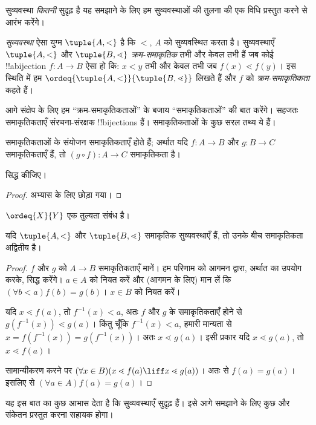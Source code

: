 \documentclass[../../../include/open-logic-section]{subfiles}
\begin{document}

सुव्यवस्था \emph{कितनी} सुदृढ़ है यह समझाने के लिए हम सुव्यवस्थाओं की तुलना
की एक विधि प्रस्तुत करने से आरंभ करेंगे।

\begin{defn}
\emph{सुव्यवस्था} ऐसा युग्म $\tuple{A, <}$ है कि $<$, $A$ को सुव्यवस्थित
करता है। सुव्यवस्थाएँ $\tuple{A, <}$ और $\tuple{B, \lessdot}$
\emph{क्रम-समाकृतिक} तभी और केवल तभी हैं जब कोई !!a{bijection}
$f \colon A \to B$ ऐसा हो कि: $x < y$ तभी और केवल तभी जब
$f(x) \lessdot f(y)$। इस स्थिति में हम
$\ordeq{\tuple{A, <}}{\tuple{B, \lessdot}}$ लिखते हैं और $f$ को
\emph{क्रम-समाकृतिकता} कहते हैं।
\end{defn}
\noindent
आगे संक्षेप के लिए हम ``क्रम-समाकृतिकताओं'' के बजाय ``समाकृतिकताओं'' की बात
करेंगे। सहजतः समाकृतिकताएँ संरचना-संरक्षक !!{bijection}s हैं। समाकृतिकताओं
के कुछ सरल तथ्य ये हैं।

\begin{lem}
समाकृतिकताओं के संयोजन समाकृतिकताएँ होते हैं; अर्थात यदि $f \colon A \to B$
और $g \colon B \to C$ समाकृतिकताएँ हैं, तो
$(g \circ f) \colon A \to C$ समाकृतिकता है।
\end{lem}
\begin{prob}
	 सिद्ध कीजिए।
\end{prob}
\begin{proof}
अभ्यास के लिए छोड़ा गया।
\end{proof}
\begin{cor}
	$\ordeq{X}{Y}$ एक तुल्यता संबंध है।
\end{cor}
\begin{prop}
यदि $\tuple{A, <}$ और $\tuple{B, \lessdot}$ समाकृतिक सुव्यवस्थाएँ हैं, तो
उनके बीच समाकृतिकता अद्वितीय है।
\end{prop}

\begin{proof}
$f$ और $g$ को $A \to B$ समाकृतिकताएँ मानें। हम परिणाम को आगमन द्वारा,
अर्थात  का उपयोग करके, सिद्ध करेंगे। $a\in A$
को नियत करें और (आगमन के लिए) मान लें कि $(\forall b < a)f(b) = g(b)$।
$x \in B$ को नियत करें।

यदि $x \lessdot f(a)$, तो $f^{-1}(x) < a$, अतः $f$ और $g$ के
समाकृतिकताएँ होने से $g(f^{-1}(x)) \lessdot g(a)$। किंतु चूँकि
$f^{-1}(x) < a$, हमारी मान्यता से
$x =f(f^{-1}(x)) = g(f^{-1}(x))$। अतः $x \lessdot g(a)$। इसी प्रकार यदि
$x \lessdot g(a)$, तो $x \lessdot f(a)$।

सामान्यीकरण करने पर
$(\forall x \in B)(x \lessdot f(a) \liff x \lessdot g(a))$। अतः
 से
$f(a) = g(a)$। इसलिए  से
$(\forall a \in A)f(a) = g(a)$।
\end{proof}\noindent 
यह इस बात का कुछ आभास देता है कि सुव्यवस्थाएँ सुदृढ़ हैं। इसे आगे समझाने के
लिए कुछ और संकेतन प्रस्तुत करना सहायक होगा।
\end{document}
